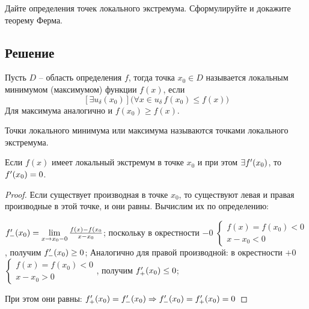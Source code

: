 Дайте определения точек локального экстремума. Сформулируйте и докажите
теорему Ферма.

\subsection*{Решение}
\begin{defi}
    Пусть $D$ -- область определения $f$, тогда точка $x_0 \in D$
    называется локальным минимумом (максимумом) функции $f(x)$, если
    $$
        [\exists u_{\delta}(x_0)]\big(\forall x \in u_{\delta} \, f(x_0)
        \leq f(x) \big)
    $$
    Для максимума аналогично и $f(x_0) \geq f(x)$.
\end{defi}

\begin{defi}
    Точки локального минимума или максимума называются точками локального
    экстремума.
\end{defi}

\begin{ther}
    Если $f(x)$ имеет локальный экстремум в точке $x_0$ и при этом $\exists
    f^{\prime}(x_0)$, то $f^{\prime}(x_0) = 0$.
\end{ther}

\begin{proof}
    Если существует производная в точке $x_0$, то существуют левая и правая
    производные в этой точке, и они равны. Вычислим их по определению:\par
    $f_{-}^{\prime}(x_0) = \lim\limits_{x \to x_0 - 0}\frac{f(x)-f(x_0}{x-x_0}$;
    поскольку в окрестности $-0$
    $
    \begin{cases}
        f(x) = f(x_0) < 0 \\
        x - x_0 < 0
    \end{cases}
    $, получим $f_{-}^{\prime}(x_0) \geq 0$;
    Аналогично для правой производной: в окрестности $+0$
    $
    \begin{cases}
        f(x) = f(x_0) < 0 \\
        x - x_0 > 0
    \end{cases}
    $, получим $f_{+}^{\prime}(x_0) \leq 0$;\par
    При этом они равны: $f_{+}^{\prime}(x_0) = f_{-}^{\prime}(x_0) \Rightarrow f_{-}^{\prime}(x_0) =
    f_{+}^{\prime}(x_0) = 0$
\end{proof}

